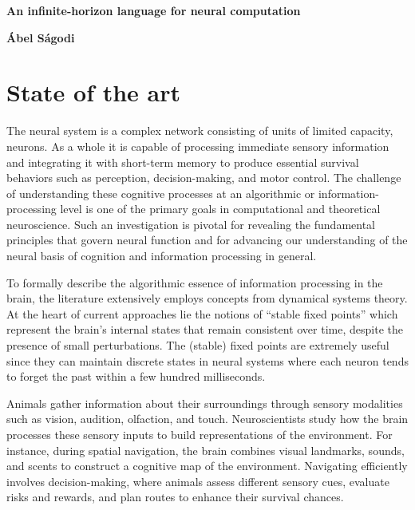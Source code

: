 \documentclass[12pt,letterpaper, onecolumn]{article}
\theoremstyle{definition}
\theoremstyle{remark}
\begin{document}

\begin{center}
\LARGE{\bf An infinite-horizon language for neural computation}
\end{center}
\begin{center}
{\textbf{\'Abel S\'agodi}}
\end{center}

\section{State of the art}
The neural system is a complex network consisting of units of limited capacity, neurons.
As a whole it is capable of processing immediate sensory information and integrating it with short-term memory to produce essential survival behaviors such as perception, decision-making, and motor control.
The challenge of understanding these cognitive processes at an algorithmic or information-processing level is one of the primary goals in computational and theoretical neuroscience.
Such an investigation is pivotal for revealing the fundamental principles that govern neural function and for advancing our understanding of the neural basis of cognition and information processing in general.

To formally describe the algorithmic essence of information processing in the brain, the literature extensively employs concepts from dynamical systems theory.
At the heart of current approaches lie the notions of ``stable fixed points'' which represent the brain's internal states that remain consistent over time, despite the presence of small perturbations.
The (stable) fixed points are extremely useful since they can maintain discrete states in neural systems where each neuron tends to forget the past within a few hundred milliseconds.

Animals gather information about their surroundings through sensory modalities such as vision, audition, olfaction, and touch. Neuroscientists study how the brain processes these sensory inputs to build representations of the environment. For instance, during spatial navigation, the brain combines visual landmarks, sounds, and scents to construct a cognitive map of the environment. Navigating efficiently involves decision-making, where animals assess different sensory cues, evaluate risks and rewards, and plan routes to enhance their survival chances. 
\end{document}
